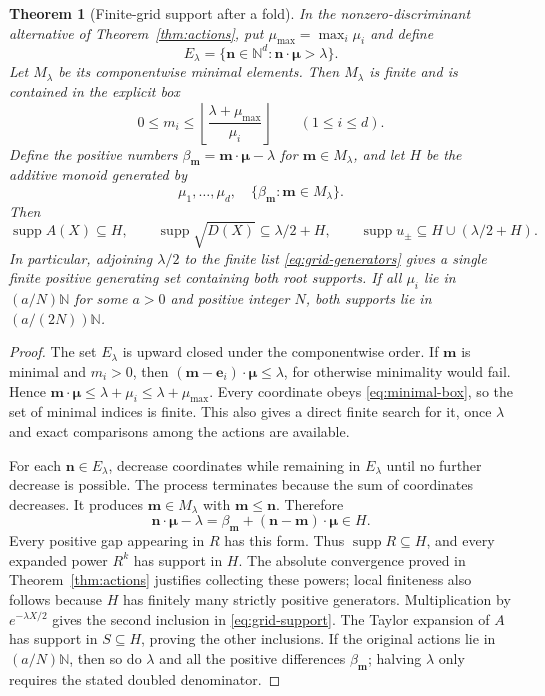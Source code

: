 \documentclass[11pt,a4paper]{article}
\newtheorem{theorem}{Theorem}[section]
\theoremstyle{definition}
\theoremstyle{remark}
\newcommand{\N}{\mathbb N}
\newcommand{\supp}{\operatorname{supp}}
\begin{document}
\begin{theorem}[Finite-grid support after a fold]\label{thm:grid}
In the nonzero-discriminant alternative of Theorem~\ref{thm:actions},
put $\mu_{\max}=\max_i\mu_i$ and define
\[
 E_\lambda=\{\bm n\in\N^d:\bm n\cdot\bm\mu>\lambda\}.
\]
Let $M_\lambda$ be its componentwise minimal elements. Then $M_\lambda$
is finite and is contained in the explicit box
\begin{equation}\label{eq:minimal-box}
 0\le m_i\le
 \left\lfloor\frac{\lambda+\mu_{\max}}{\mu_i}\right\rfloor
 \qquad(1\le i\le d).
\end{equation}
Define the positive numbers
$\beta_{\bm m}=\bm m\cdot\bm\mu-\lambda$ for
$\bm m\in M_\lambda$, and let $H$ be the additive monoid generated by
\begin{equation}\label{eq:grid-generators}
 \mu_1,\ldots,\mu_d,
 \quad \{\beta_{\bm m}:\bm m\in M_\lambda\}.
\end{equation}
Then
\begin{equation}\label{eq:grid-support}
 \supp A(X)\subseteq H,\qquad
 \supp\sqrt{D(X)}\subseteq\lambda/2+H,\qquad
 \supp u_\pm\subseteq H\cup(\lambda/2+H).
\end{equation}
In particular, adjoining $\lambda/2$ to the finite list
\eqref{eq:grid-generators} gives a single finite positive generating set
containing both root supports. If all $\mu_i$ lie in
$(a/N)\N$ for some $a>0$ and positive integer $N$, both supports lie in
$(a/(2N))\N$.
\end{theorem}
\begin{proof}
The set $E_\lambda$ is upward closed under the componentwise order.
If $\bm m$ is minimal and $m_i>0$, then
$(\bm m-\bm e_i)\cdot\bm\mu\le\lambda$, for otherwise minimality would
fail. Hence
$\bm m\cdot\bm\mu\le\lambda+\mu_i\le\lambda+\mu_{\max}$.
Every coordinate obeys \eqref{eq:minimal-box}, so the set of minimal
indices is finite. This also gives a direct finite search for it, once
$\lambda$ and exact comparisons among the actions are available.

For each $\bm n\in E_\lambda$, decrease coordinates while remaining in
$E_\lambda$ until no further decrease is possible. The process terminates
because the sum of coordinates decreases. It produces
$\bm m\in M_\lambda$ with $\bm m\le\bm n$. Therefore
\[
 \bm n\cdot\bm\mu-\lambda
 =\beta_{\bm m}+(\bm n-\bm m)\cdot\bm\mu\in H.
\]
Every positive gap appearing in $R$ has this form. Thus $\supp R\subseteq H$,
and every expanded power $R^k$ has support in $H$. The absolute
convergence proved in Theorem~\ref{thm:actions} justifies collecting
these powers; local finiteness also follows because $H$ has finitely many
strictly positive generators. Multiplication by $e^{-\lambda X/2}$ gives
the second inclusion in \eqref{eq:grid-support}.
The Taylor expansion of $A$ has support in $S\subseteq H$, proving the
other inclusions. If the original actions lie in $(a/N)\N$, then so do
$\lambda$ and all the positive differences $\beta_{\bm m}$; halving
$\lambda$ only requires the stated doubled denominator.
\end{proof}
\end{document}
